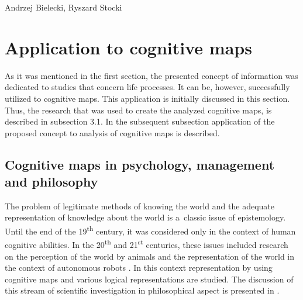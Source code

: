 \begin{artengenv2auth}{Andrzej Bielecki, Ryszard Stocki}
\section{Application to cognitive maps}

As it was mentioned in the first section, the presented concept of information was dedicated to studies that concern life processes. It can be, however, successfully utilized to cognitive maps. This application is initially discussed in this section. Thus, the research that was used to create the analyzed cognitive maps, is described in subsection 3.1. In the subsequent subsection application of the proposed concept to analysis of cognitive maps is described.



\subsection{Cognitive maps in psychology, management and philosophy}



The problem of legitimate methods of knowing the world and the adequate representation of knowledge about the world is a~classic issue of epistemology. Until the end of the 19\textsuperscript{th} century, it was considered only in the context of human cognitive abilities. In the 20\textsuperscript{th} and 21\textsuperscript{st} centuries, these issues included research on the perception of the world by animals and the representation of the world in the context of autonomous robots 
\parencite[see, e.g.,][]{bielecki_systemic_2021}. %
 In this context representation by using cognitive maps and various logical representations are studied. The discussion of this stream of scientific investigation in philosophical aspect is presented in 
\parencite[][]{rescorla_cognitive_2009}.%





\end{artengenv2auth}
